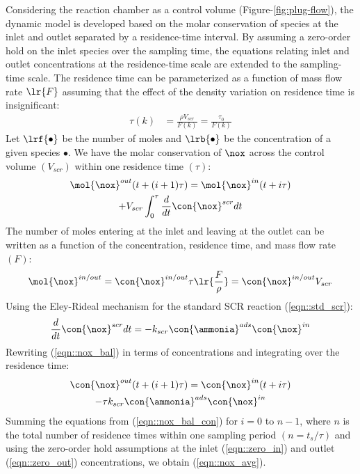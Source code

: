 Considering the reaction chamber as a control volume (Figure-\ref{fig:plug-flow}), the dynamic model is developed based
on the molar conservation of species at the inlet and outlet separated by a residence-time interval. By assuming a
zero-order hold on the inlet species over the sampling time, the equations relating inlet and outlet concentrations at
the residence-time scale are extended to the sampling-time scale. The residence time can be parameterized as a function of mass flow rate $\lr{F}$ assuming that the effect of the density variation on residence time is insignificant:
\begin{align}
    \tau(k) &= \frac{\rho V_{scr}}{F(k)} = \frac{\tau_0}{F(k)}
    \label{eqn::res_time}
\end{align}
Let $\lrf{\bullet}$ be the number of moles and $\lrb{\bullet}$ be the concentration of a given species $\bullet$. We have the molar conservation of $\nox$ across the control volume $(V_{scr})$ within one residence time $(\tau)$:
\begin{multline}
        \mol{\nox}^{out} (t + (i+1) \tau) =
                \mol{\nox}^{in} (t + i \tau) \\
                + V_{scr} \int_0^{\tau} \frac{d}{dt} \con{\nox}^{scr}dt
        \label{eqn::nox_bal}
\end{multline}
The number of moles entering at the inlet and leaving at the outlet can be written as a function of the concentration, residence time, and mass flow rate $(F)$:
\begin{align}
    \mol{\nox}^{in/out} = \con{\nox}^{in/out} \tau \lr{\frac{F}{\rho}} = \con{\nox}^{in/out} V_{scr}
\end{align}
Using the Eley-Rideal mechanism for the standard SCR reaction (\ref{eqn::std_scr}):
\begin{align}
    \frac{d}{dt} \con{\nox}^{scr}dt = -k_{scr} \con{\ammonia}^{ads} \con{\nox}^{in}
\end{align}
Rewriting (\ref{eqn::nox_bal}) in terms of concentrations and integrating over the residence time:
\begin{multline}
        \con{\nox}^{out} (t + (i+1) \tau) =
                \con{\nox}^{in} (t + i \tau) \\
                -\tau k_{scr} \con{\ammonia}^{ads} \con{\nox}^{in}
        \label{eqn::nox_bal_con}
\end{multline}
Summing the equations from (\ref{eqn::nox_bal_con}) for  $i = 0$ to $n-1$, where $n$ is the total number of residence
times within one sampling period $(n= t_s/\tau)$ and using the zero-order hold assumptions at the inlet
(\ref{eqn::zero_in}) and outlet (\ref{eqn::zero_out}) concentrations, we obtain (\ref{eqn::nox_avg}).

